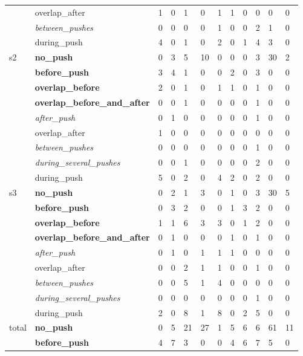 \begin{table*}[h]
\begin{tabular*}{\hsize}{@{\extracolsep{\fill}}llllllllllll}
    & overlap\_after & 1 & 0 & 1 & 0 & 1 & 1 & 0 & 0 & 0 & 0\\
    & \textsl{between\_pushes} & 0 & 0 & 0 & 0 & 1 & 0 & 0 & 2 & 1 & 0\\
    & during\_push & 4 & 0 & 1 & 0 & 2 & 0 & 1 & 4 & 3 & 0\\
    \midrule
    \multirow{8}{*}{s2} & \textbf{no\_push} & 0 & 3 & 5 & 10 & 0 & 0 & 0 & 3 & 30 & 2\\
    & \textbf{before\_push} & 3 & 4 & 1 & 0 & 0 & 2 & 0 & 3 & 0 & 0\\
    & \textbf{overlap\_before} & 2 & 0 & 1 & 0 & 1 & 1 & 0 & 1 & 0 & 0\\
    & \textbf{overlap\_before\_and\_after} & 0 & 0 & 1 & 0 & 0 & 0 & 0 & 1 & 0 & 0\\
    & \textsl{after\_push} & 0 & 1 & 0 & 0 & 0 & 0 & 0 & 1 & 0 & 0\\
    & overlap\_after & 1 & 0 & 0 & 0 & 0 & 0 & 0 & 0 & 0 & 0\\
    & \textsl{between\_pushes} & 0 & 0 & 0 & 0 & 0 & 0 & 0 & 1 & 0 & 0\\
    & \textsl{during\_several\_pushes} & 0 & 0 & 1 & 0 & 0 & 0 & 0 & 2 & 0 & 0\\
    & during\_push & 5 & 0 & 2 & 0 & 4 & 2 & 0 & 2 & 0 & 0\\
    \midrule
    \multirow{8}{*}{s3} & \textbf{no\_push} & 0 & 2 & 1 & 3 & 0 & 1 & 0 & 3 & 30 & 5\\
    & \textbf{before\_push} & 0 & 3 & 2 & 0 & 0 & 1 & 3 & 2 & 0 & 0\\
    & \textbf{overlap\_before} & 1 & 1 & 6 & 3 & 3 & 0 & 1 & 2 & 0 & 0\\
    & \textbf{overlap\_before\_and\_after} & 0 & 1 & 0 & 0 & 0 & 1 & 0 & 1 & 0 & 0\\
    & \textsl{after\_push} & 0 & 1 & 0 & 1 & 1 & 1 & 0 & 0 & 0 & 0\\
    & overlap\_after & 0 & 0 & 2 & 1 & 1 & 0 & 0 & 1 & 0 & 0\\
    & \textsl{between\_pushes} & 0 & 0 & 5 & 1 & 4 & 0 & 0 & 0 & 0 & 0\\
    & \textsl{during\_several\_pushes} & 0 & 0 & 0 & 0 & 0 & 0 & 0 & 1 & 0 & 0\\
    & during\_push & 2 & 0 & 8 & 1 & 8 & 0 & 2 & 5 & 0 & 0\\
    \midrule
    \multirow{8}{*}{total} & \textbf{no\_push} & 0 & 5 & 21 & 27 & 1 & 5 & 6 & 6 & 61 & 11\\
    & \textbf{before\_push} & 4 & 7 & 3 & 0 & 0 & 4 & 6 & 7 & 5 & 0\\

\end{tabular*}
\end{table*}

